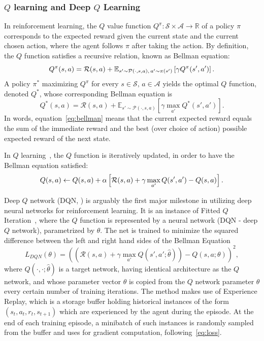 \documentclass[reqno,11pt]{article}
\begin{document}
\subsubsection {$Q$ learning and Deep $Q$ Learning}\label{sec:dqn}
In reinforcement learning, the $Q$ value function $Q^\pi:\mathcal{S}\times \mathcal{A} \rightarrow \mathbb{R}$ of a policy $\pi$  corresponds to the expected reward given the current state and the current chosen action, where the agent follows $\pi$ after taking the action.
By definition, the $Q$ function satisfies a recursive relation, known as Bellman equation\citep{sutton2018reinforcement}:
\begin{equation}
Q^\pi(s, a) =\mathcal{R}(s, a) + \mathbb{E}_{s' \sim\mathcal{P}(\cdot, s, a),\, a' \sim \pi(s')} \left [\gamma Q^\pi(s', a')\right].\notag
\end{equation}
A policy $\pi^*$ maximizing $Q^\pi$ for every $s\in \mathcal{S},\, a\in\mathcal{A}$ yields the optimal $Q$ function, denoted $Q^*$, whose corresponding Bellman equation is
\begin{equation}
Q^*(s, a) =\mathcal{R}(s, a) + \mathbb{E}_{s' \sim\mathcal{P}(\cdot, s, a)} \left [\gamma \max_{a'} Q^*(s', a')\right]. \label{eq:bellman}
\end{equation}
In words, equation~\eqref{eq:bellman} means that the current expected reward equals the sum of the immediate reward and the best (over choice of action) possible expected reward of the next state. 

In $Q$ learning~\citep{watkins1992q}, the $Q$ function is iteratively updated, in order to have the Bellman equation satisfied:
\begin{equation}
Q(s, a) \leftarrow Q(s, a)  + \alpha \left[\mathcal{R}(s, a) + \gamma \max_{a'} Q(s', a') - Q(s, a)  \right].\notag
\end{equation}

Deep $Q$ network (DQN, \citep{mnih2015human}) is arguably the first major milestone in utilizing deep neural networks for reinforcement learning. It is an instance of Fitted $Q$ Iteration~\citep{ernst2005tree}, where the $Q$ function is represented by a neural network (DQN - deep $Q$ network), parametrized by $\theta$.
The net is trained to minimize the squared difference between the left and right hand sides of the Bellman Equation 
\begin{equation}
L_{DQN}(\theta) = \left( \left(\mathcal{R}(s, a) + \gamma \max_{a'} Q(s', a'; \hat{\theta})\right) - Q(s, a; \theta)\right)^2, \label{eq:loss}
\end{equation}
where $Q(\cdot, \cdot; \hat{\theta})$ is a target network, having identical architecture as the $Q$ network, and whose parameter vector $\hat{\theta}$ is copied from the $Q$ network parameter $\theta$ every certain number of training iterations.
The method makes use of Experience Replay, which is a storage buffer holding historical instances of the form $(s_t, a_t, r_t, s_{t+1})$ which are experienced by the agent during the episode. At the end of each training episode, a minibatch of such instances is randomly sampled from the buffer and uses for gradient computation, following~\eqref{eq:loss}.
\end{document}
